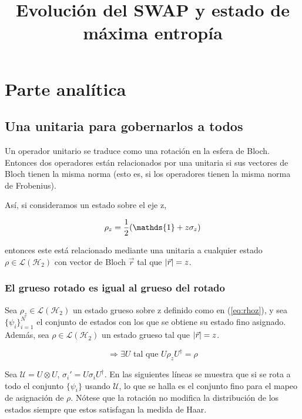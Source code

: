 \documentclass[onecolumn,11pt]{article}
\title{Evolución del SWAP y estado de máxima entropía}
\newcommand{\mcU}{\mathcal{U}}
\newcommand{\mcL}{\mathcal{L}}
\newcommand{\mcH}{\mathcal{H}}
\newcommand{\Id}{\mathds{1}}%
\begin{document}
\maketitle
\thispagestyle{empty}
\section{Parte analítica}
\subsection{Una unitaria para gobernarlos a todos}

Un operador unitario se traduce como una rotación en la esfera de Bloch. Entonces dos operadores están relacionados por una unitaria si sus vectores de Bloch tienen la misma norma (esto es, si los operadores tienen la misma norma de Frobenius).

Así, si consideramos un estado sobre el eje z,

\begin{equation}\label{eq:rhoz}
\rho_{z}=\frac{1}{2}\qty(\Id+z\sigma_{z})
\end{equation}

entonces este está relacionado mediante una unitaria a cualquier estado $\rho\in\mcL(\mcH_{2})$ con vector de Bloch $\vec{r}$ tal que $\abs{\vec{r}}=z$.

\subsubsection{El grueso rotado es igual al grueso del rotado}
Sea $\rho_{z}\in\mcL(\mcH_{2})$ un estado grueso sobre z definido como en (\ref{eq:rhoz}), y sea $\{\psi_{i}\}_{i=1}^{N}$ el conjunto de estados con los que se obtiene su estado fino asignado. Además, sea $\rho\in\mcL(\mcH_{2})$ un estado grueso tal que $\abs{\vec{r}}=z$.

\begin{equation}
\Rightarrow \exists U \text{ tal que } U\rho_{z}U^{\dag}=\rho
\end{equation}

Sea $\mcU=U\otimes U$, $\sigma_{i}'=U\sigma_{i}U^{\dag}$. En las siguientes líneas se muestra que si se rota a todo el conjunto $\{\psi_{i}\}$ usando $\mcU$, lo que se halla es el conjunto fino para el mapeo de asignación de $\rho$. Nótese que la rotación no modifica la distribución de los estados siempre que estos satisfagan la medida de Haar.
\end{document}

